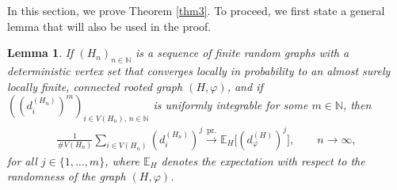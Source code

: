 \documentclass[11pt]{article}
\numberwithin{equation}{section}
\theoremstyle{plain}
\newtheorem{lemma}[theorem]{Lemma}
\newcommand{\N}{\mathbb N}
\newcommand{\prob}{\overset{\mathrm{pr.}}{\longrightarrow}}
\newcommand{\E}{\mathbb E}
\begin{document}
In this section, we prove Theorem \ref{thm3}. To proceed, we first state a general lemma that will also be used in the proof.

\begin{lemma}
\label{lem}
If $(H_{n})_{n\in\N}$ is a sequence of finite random graphs with a deterministic vertex set that converges locally in probability to an almost surely locally finite, connected rooted graph $(H, \varphi)$, and if $((d_{i}^{(H_{n})})^{m})_{i\in V(H_{n}),\, n\in\N}$ is uniformly integrable for some $m \in \N$, then
\begin{align*}
\frac{1}{\#V(H_{n})}\sum_{i\in V(H_{n})}(d_{i}^{(H_{n})})^{j}\prob \E_{H}\big[(d_{\varphi}^{(H)})^{j}\big],\qquad n\to\infty ,
\end{align*}
for all $j\in\{1,\ldots,m\}$, where $\E_{H}$ denotes the expectation with respect to the randomness of the graph $(H, \varphi)$. 
\end{lemma}
\end{document}
